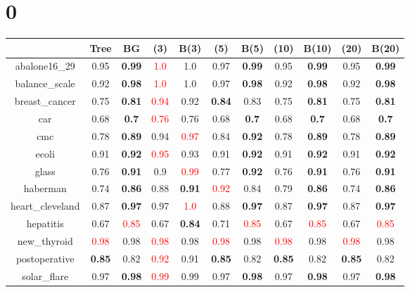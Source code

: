 \documentclass{article}%
\begin{document}
%
\normalsize%
\section*{0}%
\begin{tabular}{c|cccccccccc}%
\hline%
&Tree&BG&(3)&B(3)&(5)&B(5)&(10)&B(10)&(20)&B(20)\\%
\hline%
abalone16\_29&0.95&\textbf{0.99}&\textcolor{red}{ 
1.0
}&1.0&0.97&\textbf{0.99}&0.95&\textbf{0.99}&0.95&\textbf{0.99}\\%
\hline%
balance\_scale&0.92&\textbf{0.98}&\textcolor{red}{ 
1.0
}&1.0&0.97&\textbf{0.98}&0.92&\textbf{0.98}&0.92&\textbf{0.98}\\%
\hline%
breast\_cancer&0.75&\textbf{0.81}&\textcolor{red}{ 
0.94
}&0.92&\textbf{0.84}&0.83&0.75&\textbf{0.81}&0.75&\textbf{0.81}\\%
\hline%
car&0.68&\textbf{0.7}&\textcolor{red}{ 
0.76
}&0.76&0.68&\textbf{0.7}&0.68&\textbf{0.7}&0.68&\textbf{0.7}\\%
\hline%
cmc&0.78&\textbf{0.89}&0.94&\textcolor{red}{ 
0.97
}&0.84&\textbf{0.92}&0.78&\textbf{0.89}&0.78&\textbf{0.89}\\%
\hline%
ecoli&0.91&\textbf{0.92}&\textcolor{red}{ 
0.95
}&0.93&0.91&\textbf{0.92}&0.91&\textbf{0.92}&0.91&\textbf{0.92}\\%
\hline%
glass&0.76&\textbf{0.91}&0.9&\textcolor{red}{ 
0.99
}&0.77&\textbf{0.92}&0.76&\textbf{0.91}&0.76&\textbf{0.91}\\%
\hline%
haberman&0.74&\textbf{0.86}&0.88&\textbf{0.91}&\textcolor{red}{ 
0.92
}&0.84&0.79&\textbf{0.86}&0.74&\textbf{0.86}\\%
\hline%
heart\_cleveland&0.87&\textbf{0.97}&0.97&\textcolor{red}{ 
1.0
}&0.88&\textbf{0.97}&0.87&\textbf{0.97}&0.87&\textbf{0.97}\\%
\hline%
hepatitis&0.67&\textcolor{red}{ 
0.85
}&0.67&\textbf{0.84}&0.71&\textcolor{red}{ 
0.85
}&0.67&\textcolor{red}{ 
0.85
}&0.67&\textcolor{red}{ 
0.85
}\\%
\hline%
new\_thyroid&\textcolor{red}{ 
0.98
}&0.98&\textcolor{red}{ 
0.98
}&0.98&\textcolor{red}{ 
0.98
}&0.98&\textcolor{red}{ 
0.98
}&0.98&\textcolor{red}{ 
0.98
}&0.98\\%
\hline%
postoperative&\textbf{0.85}&0.82&\textcolor{red}{ 
0.92
}&0.91&\textbf{0.85}&0.82&\textbf{0.85}&0.82&\textbf{0.85}&0.82\\%
\hline%
solar\_flare&0.97&\textbf{0.98}&\textcolor{red}{ 
0.99
}&0.99&0.97&\textbf{0.98}&0.97&\textbf{0.98}&0.97&\textbf{0.98}\\%

\end{tabular}
\end{document}
